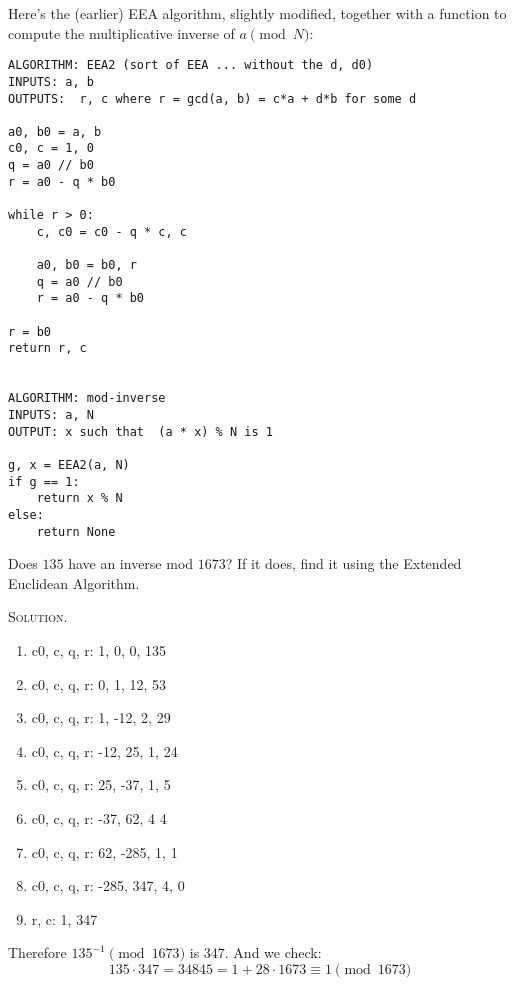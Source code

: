 Here's the (earlier) EEA algorithm, slightly modified,
together with a function to compute the multiplicative inverse of $a \pmod{N}$:
\begin{Verbatim}[frame=single, fontsize=\footnotesize]
ALGORITHM: EEA2 (sort of EEA ... without the d, d0)
INPUTS: a, b
OUTPUTS:  r, c where r = gcd(a, b) = c*a + d*b for some d

a0, b0 = a, b
c0, c = 1, 0
q = a0 // b0
r = a0 - q * b0

while r > 0:   
    c, c0 = c0 - q * c, c

    a0, b0 = b0, r
    q = a0 // b0
    r = a0 - q * b0

r = b0
return r, c


ALGORITHM: mod-inverse
INPUTS: a, N
OUTPUT: x such that  (a * x) % N is 1

g, x = EEA2(a, N)
if g == 1:
    return x % N
else:
    return None
\end{Verbatim}


\begin{eg}
Does $135$ have an inverse mod $1673$?
If it does, find it using the Extended Euclidean Algorithm.
\end{eg}
\textsc{Solution}.
\begin{enumerate}[nosep]
  \item c0, c, q, r: 1, 0, 0, 135
  \item c0, c, q, r: 0, 1, 12, 53
  \item c0, c, q, r: 1, -12, 2, 29
  \item c0, c, q, r: -12, 25, 1, 24
  \item c0, c, q, r: 25, -37, 1, 5
  \item c0, c, q, r: -37, 62, 4 4
  \item c0, c, q, r: 62, -285, 1, 1
  \item c0, c, q, r: -285, 347, 4, 0
  \item r, c: 1, 347
\end{enumerate}
Therefore $135^{-1} \pmod{1673}$ is $347$.
And we check:
\[
135 \cdot 347 = 34845 = 1 + 28 \cdot 1673 \equiv 1 \pmod{1673}  
\]





